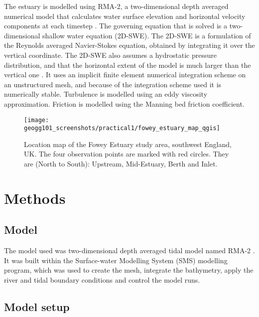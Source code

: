\documentclass{article}
\begin{document}
The estuary is modelled using RMA-2, a two-dimensional depth averaged numerical model that calculates water surface elevation and horizontal velocity components at each timestep \parencite{king1990program}.
The governing equation that is solved is a two-dimensional shallow water equation (2D-SWE). The 2D-SWE is a formulation of the Reynolds averaged Navier-Stokes equation, obtained by integrating it over the vertical coordinate. The 2D-SWE also assumes a hydrostatic pressure distribution, and that the horizontal extent of the model is much larger than the vertical one \parencite{cea2006numerical}.
It uses an implicit finite element numerical integration scheme on an unstructured mesh, and because of the integration scheme used it is numerically stable. Turbulence is modelled using an eddy viscosity approximation. Friction is modelled using the Manning bed friction coefficient.

\begin{figure}[hbp]
    \centering
    \texttt{[image: geogg101\_screenshots/practical1/fowey\_estuary\_map\_qgis]}
    \caption{Location map of the Fowey Estuary study area, southwest England, UK. The four observation points are marked with red circles. They are (North to South): Upstream, Mid-Estuary, Berth and Inlet. }
    \label{fig:fowey_estuary_map}
\end{figure}


\section{Methods}

\subsection{Model}

The model used was two-dimensional depth averaged tidal model named RMA-2 \parencite{king1990program}. It was built within the Surface-water Modelling System (SMS) modelling program, which was used to create the mesh, integrate the bathymetry, apply the river and tidal boundary conditions and control the model runs.

\subsection{Model setup}
\end{document}
